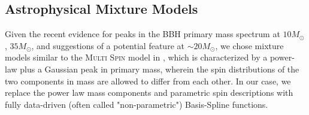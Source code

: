 
\subsection{Astrophysical Mixture Models} \label{sec:astromodels} 

Given the recent evidence for peaks \citep{2019ApJ...882L..24A, 2021ApJ...913L...7A, 2023PhRvX..13a1048A, 2022ApJ...928..155T,2022ApJ...924..101E, 2022arXiv221012834E,10.48550/arXiv.2302.07289} in the BBH primary mass spectrum at $10 M_{\odot}$, $35 M_{\odot}$, and suggestions of a potential feature at $\sim20 M_{\odot}$, we chose mixture models similar to the \textsc{Multi Spin} model in \cite{2021ApJ...913L...7A}, which is characterized by a power-law plus a Gaussian peak in primary mass, wherein the spin distributions of the two components in mass are allowed to differ from each other. In our case, we replace the power law mass components and parametric spin descriptions with fully data-driven (often called "non-parametric") Basis-Spline functions.

